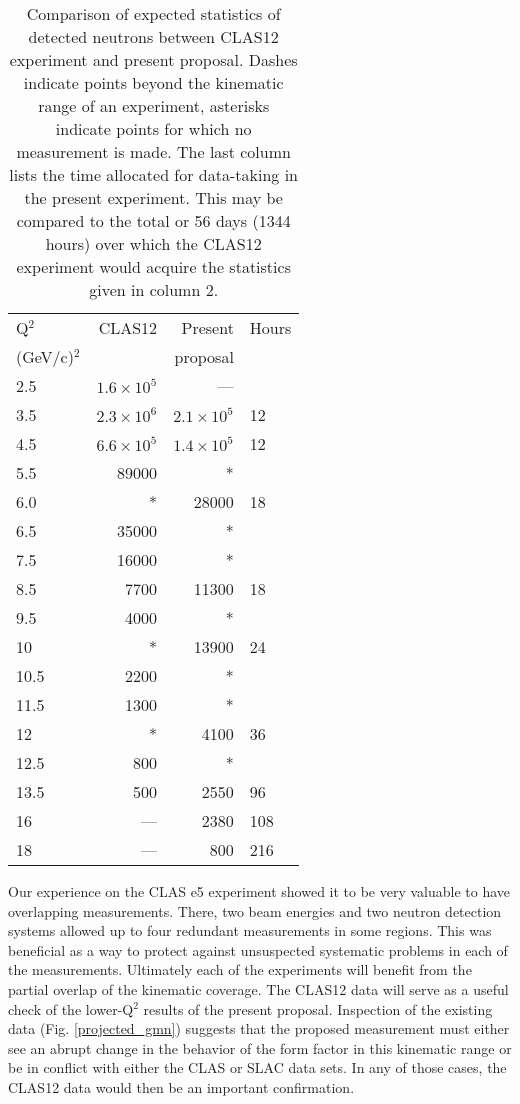 \documentclass[12pt,letterpaper,oneside]{article}
\begin{document}
\begin{table}
\begin{center}
\caption{\label{CLAS_vs_us}
Comparison of expected statistics of detected neutrons between CLAS12
experiment and present proposal.  Dashes indicate points beyond the
kinematic range of an experiment, asterisks indicate points for which
no measurement is made.  The last column lists the time allocated for
data-taking in the present experiment.  This may be compared to the
total or 56 days (1344 hours) over which the CLAS12 experiment would
acquire the statistics given in column 2.}
\vspace{.2in}
{\begin{tabular}{|l|r|r|l|}
\hline
Q$^2$ &CLAS12&Present&Hours\\
(GeV/c)$^2$&&proposal&\\
\hline
2.5&$1.6\times 10^5$&---&\\
3.5&$2.3\times 10^6$&$2.1\times 10^5$&12\\
4.5&$6.6\times 10^5$&$1.4\times 10^5$&12\\
5.5&89000&*&\\
6.0&*&28000&18\\
6.5&35000&*&\\
7.5&16000&*&\\
8.5&7700&11300&18\\
9.5&4000&*&\\
10&*&13900&24\\
10.5&2200&*&\\
11.5&1300&*&\\
12&*&4100&36\\
12.5&800&*&\\
13.5&500&2550&96\\
16&---&2380&108\\
18&---&800&216\\
\hline
\end{tabular}}
\end{center}
\end{table}

Our experience on the CLAS e5 experiment showed it to be very valuable
to have overlapping measurements.  
There, two beam energies and two neutron detection systems allowed up 
to four redundant measurements in some regions.  
This was beneficial as a way to protect against
unsuspected systematic problems in each of the measurements.
Ultimately each of the experiments will benefit from the partial
overlap of the kinematic coverage.  
The CLAS12 data will serve as a useful check 
of the lower-Q$^2$ results of the present proposal.  
Inspection of the existing data (Fig. \ref{projected_gmn}) suggests 
that the proposed measurement must either see an 
abrupt change in the behavior of the form
factor in this kinematic range or  
be in conflict with either the CLAS \cite{Jeff} or SLAC 
\cite{SLAC_Rock} data sets.
In any of those cases, the CLAS12 data would then be an important confirmation.
\end{document}
